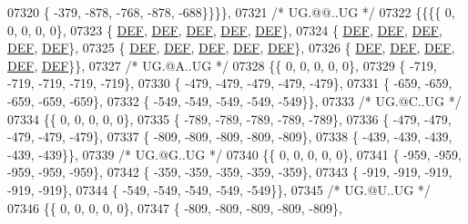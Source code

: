 \begin{DoxyCode}
07320 \{ -379, -878, -768, -878, -688\}\}\}\},
07321 \textcolor{comment}{/* UG.@@..UG */}
07322 \{\{\{\{    0,    0,    0,    0,    0\},
07323 \{  \mbox{\hyperlink{1_88_84__epars_8h_a397419fc12b37ed479c8abb9d444d843}{DEF}},  \mbox{\hyperlink{1_88_84__epars_8h_a397419fc12b37ed479c8abb9d444d843}{DEF}},  \mbox{\hyperlink{1_88_84__epars_8h_a397419fc12b37ed479c8abb9d444d843}{DEF}},  \mbox{\hyperlink{1_88_84__epars_8h_a397419fc12b37ed479c8abb9d444d843}{DEF}},  \mbox{\hyperlink{1_88_84__epars_8h_a397419fc12b37ed479c8abb9d444d843}{DEF}}\},
07324 \{  \mbox{\hyperlink{1_88_84__epars_8h_a397419fc12b37ed479c8abb9d444d843}{DEF}},  \mbox{\hyperlink{1_88_84__epars_8h_a397419fc12b37ed479c8abb9d444d843}{DEF}},  \mbox{\hyperlink{1_88_84__epars_8h_a397419fc12b37ed479c8abb9d444d843}{DEF}},  \mbox{\hyperlink{1_88_84__epars_8h_a397419fc12b37ed479c8abb9d444d843}{DEF}},  \mbox{\hyperlink{1_88_84__epars_8h_a397419fc12b37ed479c8abb9d444d843}{DEF}}\},
07325 \{  \mbox{\hyperlink{1_88_84__epars_8h_a397419fc12b37ed479c8abb9d444d843}{DEF}},  \mbox{\hyperlink{1_88_84__epars_8h_a397419fc12b37ed479c8abb9d444d843}{DEF}},  \mbox{\hyperlink{1_88_84__epars_8h_a397419fc12b37ed479c8abb9d444d843}{DEF}},  \mbox{\hyperlink{1_88_84__epars_8h_a397419fc12b37ed479c8abb9d444d843}{DEF}},  \mbox{\hyperlink{1_88_84__epars_8h_a397419fc12b37ed479c8abb9d444d843}{DEF}}\},
07326 \{  \mbox{\hyperlink{1_88_84__epars_8h_a397419fc12b37ed479c8abb9d444d843}{DEF}},  \mbox{\hyperlink{1_88_84__epars_8h_a397419fc12b37ed479c8abb9d444d843}{DEF}},  \mbox{\hyperlink{1_88_84__epars_8h_a397419fc12b37ed479c8abb9d444d843}{DEF}},  \mbox{\hyperlink{1_88_84__epars_8h_a397419fc12b37ed479c8abb9d444d843}{DEF}},  \mbox{\hyperlink{1_88_84__epars_8h_a397419fc12b37ed479c8abb9d444d843}{DEF}}\}\},
07327 \textcolor{comment}{/* UG.@A..UG */}
07328 \{\{    0,    0,    0,    0,    0\},
07329 \{ -719, -719, -719, -719, -719\},
07330 \{ -479, -479, -479, -479, -479\},
07331 \{ -659, -659, -659, -659, -659\},
07332 \{ -549, -549, -549, -549, -549\}\},
07333 \textcolor{comment}{/* UG.@C..UG */}
07334 \{\{    0,    0,    0,    0,    0\},
07335 \{ -789, -789, -789, -789, -789\},
07336 \{ -479, -479, -479, -479, -479\},
07337 \{ -809, -809, -809, -809, -809\},
07338 \{ -439, -439, -439, -439, -439\}\},
07339 \textcolor{comment}{/* UG.@G..UG */}
07340 \{\{    0,    0,    0,    0,    0\},
07341 \{ -959, -959, -959, -959, -959\},
07342 \{ -359, -359, -359, -359, -359\},
07343 \{ -919, -919, -919, -919, -919\},
07344 \{ -549, -549, -549, -549, -549\}\},
07345 \textcolor{comment}{/* UG.@U..UG */}
07346 \{\{    0,    0,    0,    0,    0\},
07347 \{ -809, -809, -809, -809, -809\},

\end{DoxyCode}

